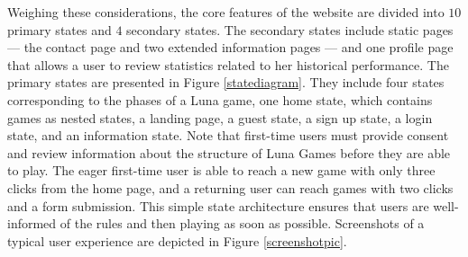 Weighing these considerations, the core features of the website are divided into $10$ primary states and $4$ secondary states. The secondary states include static pages --- the contact page and two extended information pages --- and one profile page that allows a user to review statistics related to her historical performance. The primary states are presented in Figure \ref{statediagram}. They include four states corresponding to the phases of a Luna game, one home state, which contains games as nested states, a landing page, a guest state, a sign up state, a login state, and an information state. Note that first-time users must provide consent and review information about the structure of Luna Games before they are able to play. The eager first-time user is able to reach a new game with only three clicks from the home page, and a returning user can reach games with two clicks and a form submission. This simple state architecture ensures that users are well-informed of the rules and then playing as soon as possible. Screenshots of a typical user experience are depicted in Figure \ref{screenshotpic}.

